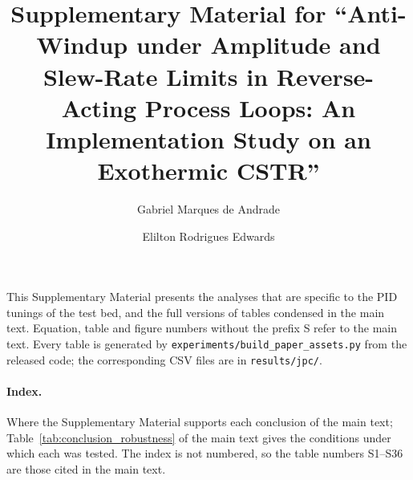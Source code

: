 \documentclass[11pt]{article}
\title{Supplementary Material for ``Anti-Windup under Amplitude and Slew-Rate Limits in Reverse-Acting Process Loops: An Implementation Study on an Exothermic CSTR''}
\author{Gabriel Marques de Andrade \and Elilton Rodrigues Edwards}
\date{}
\begin{document}
\maketitle
\sloppy  %
This Supplementary Material presents the analyses that are specific to the PID tunings of the test bed, and the full versions of tables condensed in the main text. Equation, table and figure numbers without the prefix S refer to the main text. Every table is generated by \texttt{experiments/build\_paper\_assets.py} from the released code; the corresponding CSV files are in \texttt{results/jpc/}.

\paragraph{Index.} Where the Supplementary Material supports each conclusion of the main text; Table~\ref{tab:conclusion_robustness} of the main text gives the conditions under which each was tested. The index is not numbered, so the table numbers S1--S36 are those cited in the main text.
\par\vspace{0.25cm}
\end{document}
